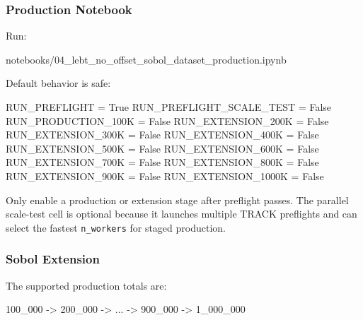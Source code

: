 \documentclass[
]{article}
\newenvironment{Shaded}{}{}
\newcommand{\NormalTok}[1]{#1}
\newcommand{\OperatorTok}[1]{\textcolor[rgb]{0.40,0.40,0.40}{#1}}
\newcommand{\VariableTok}[1]{\textcolor[rgb]{0.10,0.09,0.49}{#1}}
\begin{document}
\hypertarget{production-notebook}{%
\subsubsection{Production Notebook}\label{production-notebook}}

Run:

\begin{Shaded}
\begin{Highlighting}[]
\NormalTok{notebooks/04\_lebt\_no\_offset\_sobol\_dataset\_production.ipynb}
\end{Highlighting}
\end{Shaded}

Default behavior is safe:

\begin{Shaded}
\begin{Highlighting}[]
\NormalTok{RUN\_PREFLIGHT }\OperatorTok{=} \VariableTok{True}
\NormalTok{RUN\_PREFLIGHT\_SCALE\_TEST }\OperatorTok{=} \VariableTok{False}
\NormalTok{RUN\_PRODUCTION\_100K }\OperatorTok{=} \VariableTok{False}
\NormalTok{RUN\_EXTENSION\_200K }\OperatorTok{=} \VariableTok{False}
\NormalTok{RUN\_EXTENSION\_300K }\OperatorTok{=} \VariableTok{False}
\NormalTok{RUN\_EXTENSION\_400K }\OperatorTok{=} \VariableTok{False}
\NormalTok{RUN\_EXTENSION\_500K }\OperatorTok{=} \VariableTok{False}
\NormalTok{RUN\_EXTENSION\_600K }\OperatorTok{=} \VariableTok{False}
\NormalTok{RUN\_EXTENSION\_700K }\OperatorTok{=} \VariableTok{False}
\NormalTok{RUN\_EXTENSION\_800K }\OperatorTok{=} \VariableTok{False}
\NormalTok{RUN\_EXTENSION\_900K }\OperatorTok{=} \VariableTok{False}
\NormalTok{RUN\_EXTENSION\_1000K }\OperatorTok{=} \VariableTok{False}
\end{Highlighting}
\end{Shaded}

Only enable a production or extension stage after preflight passes. The
parallel scale-test cell is optional because it launches multiple TRACK
preflights and can select the fastest \texttt{n\_workers} for staged
production.

\hypertarget{sobol-extension}{%
\subsubsection{Sobol Extension}\label{sobol-extension}}

The supported production totals are:

\begin{Shaded}
\begin{Highlighting}[]
\NormalTok{100\_000 {-}\textgreater{} 200\_000 {-}\textgreater{} ... {-}\textgreater{} 900\_000 {-}\textgreater{} 1\_000\_000}
\end{Highlighting}
\end{Shaded}
\end{document}
